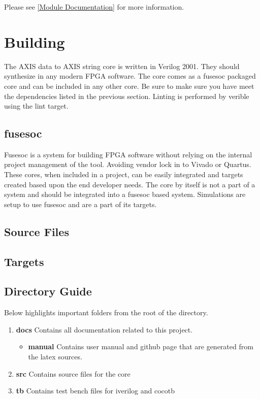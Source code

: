 Please see \ref{Module Documentation} for more information.

\section{Building}

\par
The AXIS data to AXIS string core is written in Verilog 2001. They should synthesize in any modern FPGA software. The core comes as a fusesoc packaged core and can be included in any other core. Be sure to make sure you have meet the dependencies listed in the previous section. Linting is performed by verible using the lint target.

\subsection{fusesoc}
\par
Fusesoc is a system for building FPGA software without relying on the internal project management of the tool. Avoiding vendor lock in to Vivado or Quartus.
These cores, when included in a project, can be easily integrated and targets created based upon the end developer needs. The core by itself is not a part of
a system and should be integrated into a fusesoc based system. Simulations are setup to use fusesoc and are a part of its targets.

\subsection{Source Files}



\subsection{Targets}



\subsection{Directory Guide}

\par
Below highlights important folders from the root of the directory.

\begin{enumerate}
  \item \textbf{docs} Contains all documentation related to this project.
    \begin{itemize}
      \item \textbf{manual} Contains user manual and github page that are generated from the latex sources.
    \end{itemize}
  \item \textbf{src} Contains source files for the core
  \item \textbf{tb} Contains test bench files for iverilog and cocotb
\end{enumerate}


